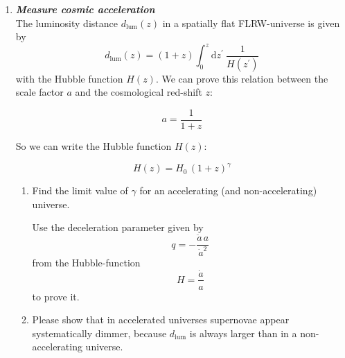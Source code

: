 \documentclass[a4paper,12pt]{article}
\newcommand{\question}[1]{\textbf{\textit{#1}}}
\begin{document}
\begin{enumerate}


\item \question{Measure cosmic acceleration}\\
The luminosity distance $d_\mathrm{lum}(z)$ in a spatially flat FLRW-universe is given by
\begin{equation}
d_\mathrm{lum}(z) = (1+z)\int_0^z\mathrm{d}z^\prime\:\frac{1}{H(z^\prime)}
\end{equation}
with the Hubble function $H(z)$. 
We can prove this relation between the scale factor $a$ and the cosmological red-shift $z$:

\begin{equation}
a=\frac{1}{1+z} 
\end{equation}

So we can write the Hubble function $H(z)$:

\begin{equation}
H(z) = H_0 \, (1+z)^{\gamma}
\end{equation}
\begin{enumerate}
\item{Find the limit value of $\gamma$ for an accelerating (and non-accelerating) universe.   

Use the deceleration parameter given by 
\[q=-\frac{\ddot{a}\,a}{\dot{a}^2}\] from the Hubble-function \[H=\frac{\dot{a}}{a}\] to prove it.}
\item{Please show that in accelerated universes supernovae appear systematically dimmer, because $d_\mathrm{lum}$ is always larger than in a non-accelerating universe.}
\end{enumerate}

\end{enumerate}
\end{document}
